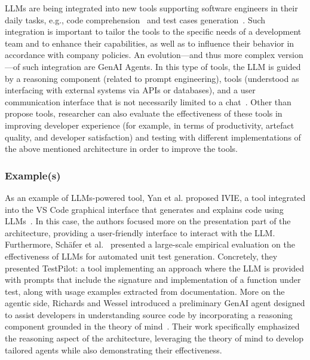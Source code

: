 LLMs are being integrated into new tools supporting software engineers in their daily tasks, e.g., code comprehension~\cite{DBLP:conf/chi/YanHWH24} and test cases generation~\cite{DBLP:journals/tse/SchaferNET24}.
Such integration is important to tailor the tools to the specific needs of a development team and to enhance their capabilities, as well as to influence their behavior in accordance with company policies.
An evolution—and thus more complex version—of such integration are GenAI Agents. In this type of tools, the LLM is guided by a reasoning component (related to prompt engineering), tools (understood as interfacing with external systems via APIs or databases), and a user communication interface that is not necessarily limited to a chat~\cite{DBLP:conf/icsm/RichardsW24, DBLP:journals/tmlr/SumersYN024, DBLP:journals/corr/abs-2309-07870}.
Other than propose tools, researcher can also evaluate the effectiveness of these tools in improving developer experience (for example, in terms of productivity, artefact quality, and developer satisfaction) and testing with different implementations of the above mentioned architecture in order to improve the tools.

\subsubsection{Example(s)}

As an example of LLMs-powered tool, Yan et al. proposed IVIE, a tool integrated into the VS Code graphical interface that generates and explains code using LLMs~\cite{DBLP:conf/chi/YanHWH24}. In this case, the authors focused more on the presentation part of the architecture, providing a user-friendly interface to interact with the LLM. 
Furthermore, Sch{\"{a}}fer et al.~\cite{DBLP:journals/tse/SchaferNET24} presented a large-scale empirical evaluation on the effectiveness of LLMs for automated unit test generation. Concretely, they presented TestPilot: a tool implementing an approach where the LLM is provided with prompts that include the signature and implementation of a function under test, along with usage examples extracted from documentation.
More on the agentic side, Richards and Wessel introduced a preliminary GenAI agent designed to assist developers in understanding source code by incorporating a reasoning component grounded in the theory of mind~\cite{DBLP:conf/icsm/RichardsW24}. Their work specifically emphasized the reasoning aspect of the architecture, leveraging the theory of mind to develop tailored agents while also demonstrating their effectiveness.

